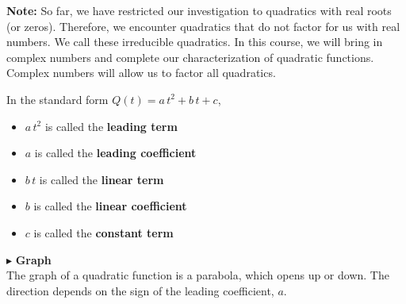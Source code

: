\documentclass{ximera}
\begin{document}
\textbf{Note:} So far, we have restricted our investigation to quadratics with real roots (or zeros).  Therefore, we encounter quadratics that do not factor for us with real numbers. We call these irreducible quadratics.  In this course, we will bring in complex numbers and complete our characterization of quadratic functions. Complex numbers will allow us to factor all quadratics.




\begin{notation} 

In the standard form $Q(t) = a \, t^2 + b \, t + c  $,


\begin{itemize}
\item $a \, t^2$ is called the \textbf{leading term}
\item $a$ is called the \textbf{leading coefficient}
\item $b \, t$ is called the \textbf{linear term}
\item $b$ is called the \textbf{linear coefficient}
\item $c$ is called the \textbf{constant term}
\end{itemize}





\end{notation}





$\blacktriangleright$ \textbf{\textcolor{red!10!blue!90!}{Graph}} \\ 

The graph of a quadratic function is a parabola, which opens up or down.  The direction depends on the sign of the leading coefficient, $a$.
\end{document}
